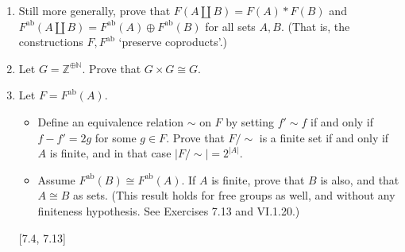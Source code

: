 \begin{enumerate}
    \item Still more generally, prove that $F(A \coprod B) = F(A) \ast F(B)$ and $F^{\text{ab}}(A \coprod B) = F^{\text{ab}}(A) \oplus F^{\text{ab}}(B)$ for all sets $A, B$. (That is, the constructions $F, F^{\text{ab}}$ `preserve coproducts'.)


    \item Let $G = \mathbb{Z}^{\oplus \mathbb{N}}$. Prove that $G \times G \cong G$.

    \item Let $F = F^{\text{ab}}(A)$.
          \begin{itemize}
              \item Define an equivalence relation $\sim$ on $F$ by setting $f' \sim f$ if and only if $f - f' = 2g$ for some $g \in F$. Prove that $F/\sim$ is a finite set if and only if $A$ is finite, and in that case $|F/\sim| = 2^{|A|}$.
              \item Assume $F^{\text{ab}}(B) \cong F^{\text{ab}}(A)$. If $A$ is finite, prove that $B$ is also, and that $A \cong B$ as sets. (This result holds for free groups as well, and without any finiteness hypothesis. See Exercises 7.13 and VI.1.20.)
          \end{itemize}


          [7.4, 7.13]
\end{enumerate}